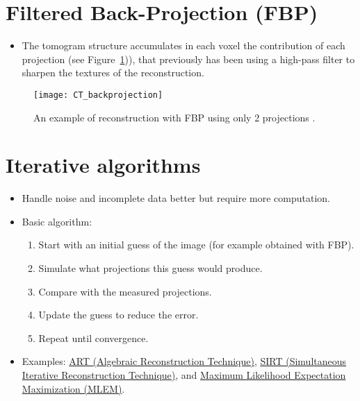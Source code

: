 \section{Filtered Back-Projection (FBP)}
\begin{itemize}
\item The tomogram structure accumulates in each voxel the
  contribution of each projection \cite{abdulla2025acquiring2} (see
  Figure~\ref{fig:CT_reconstruction})), that previously has been
   using a high-pass
  filter to sharpen the textures of the reconstruction.
\end{itemize}

\label{sec:FBP_example}
\vspace{-0ex}
\begin{figure}[H]
  \centering
  \texttt{[image: CT\_backprojection]}
  \caption{An example of reconstruction with FBP using only 2
    projections
    \cite{abdulla2025acquiring2}.\label{fig:CT_reconstruction}}
\end{figure}

\section{Iterative algorithms}
\begin{itemize}
\item Handle noise and incomplete data better but require more computation.
\item Basic algorithm:
  \begin{enumerate}
  \item Start with an initial guess of the image (for example obtained with FBP).
  \item Simulate what projections this guess would produce.
  \item Compare with the measured projections.
  \item Update the guess to reduce the error.
  \item Repeat until convergence.
  \end{enumerate}
\item Examples:
  \href{https://en.wikipedia.org/wiki/Algebraic_reconstruction_technique}{ART
    (Algebraic Reconstruction Technique)},
  \href{https://tomroelandts.com/articles/the-sirt-algorithm}{SIRT
    (Simultaneous Iterative Reconstruction Technique)}, and
  \href{https://arxiv.org/pdf/1504.06889}{Maximum Likelihood
    Expectation Maximization (MLEM)}.
\end{itemize}

